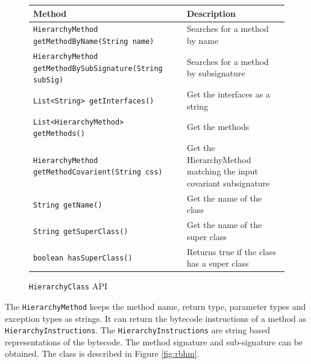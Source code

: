 \documentclass{sigplanconf}
\begin{document}
\begin{figure}[htbf]
\begin{tabularx}{\textwidth}{|XX|}
\hline
{\bf Method} & {\bf Description }\\\hline
{\tt HierarchyMethod getMethodByName(String name)} &  Searches for a 
    method by name\\\hline
{\tt HierarchyMethod getMethodBySubSignature(String subSig)} & 
    Searches for a method by subsignature\\\hline
{\tt List<String> getInterfaces()} & Get the interfaces as a string \\\hline
{\tt List<HierarchyMethod> getMethods()} & Get the methods\\\hline
{\tt HierarchyMethod getMethodCovarient(String css)} & Get the
    HierarchyMethod matching the input covariant subsignature\\\hline
{\tt String getName()} & Get the name of the class\\\hline
{\tt String getSuperClass()} & Get the name of the super class\\\hline 
{\tt boolean hasSuperClass()} & Returns true if the class has a 
    super class\\\hline
\end{tabularx}
\caption{{\tt HierarchyClass} API}
\label{fig:rbhc}
\end{figure}

The {\tt HierarchyMethod} keeps the method name, return type, parameter types and exception types as strings. It can return the bytecode instructions of a method as {\tt HierarchyInstructions}. The {\tt HierarchyInstructions} are string based representations of the bytecode. The method signature and sub-signature can be obtained. The class is described in Figure \ref{fig:rbhm}.
\end{document}
